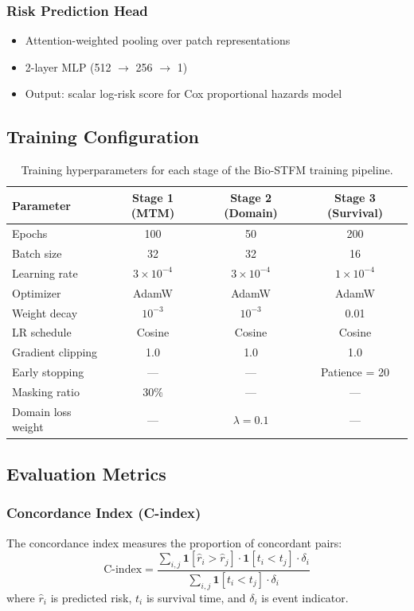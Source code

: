 \documentclass[11pt,a4paper]{article}
\begin{document}
\subsubsection{Risk Prediction Head}
\begin{itemize}
    \item Attention-weighted pooling over patch representations
    \item 2-layer MLP (512 $\rightarrow$ 256 $\rightarrow$ 1)
    \item Output: scalar log-risk score for Cox proportional hazards model
\end{itemize}

\subsection{Training Configuration}

\begin{table}[H]
\centering
\small
\caption{Training hyperparameters for each stage of the Bio-STFM training pipeline.}
\begin{tabular}{@{}lccc@{}}
\toprule
\textbf{Parameter} & \textbf{Stage 1 (MTM)} & \textbf{Stage 2 (Domain)} & \textbf{Stage 3 (Survival)} \\
\midrule
Epochs & 100 & 50 & 200 \\
Batch size & 32 & 32 & 16 \\
Learning rate & $3 \times 10^{-4}$ & $3 \times 10^{-4}$ & $1 \times 10^{-4}$ \\
Optimizer & AdamW & AdamW & AdamW \\
Weight decay & $10^{-3}$ & $10^{-3}$ & 0.01 \\
LR schedule & Cosine & Cosine & Cosine \\
Gradient clipping & 1.0 & 1.0 & 1.0 \\
Early stopping & --- & --- & Patience = 20 \\
Masking ratio & 30\% & --- & --- \\
Domain loss weight & --- & $\lambda = 0.1$ & --- \\
\bottomrule
\end{tabular}
\end{table}

\subsection{Evaluation Metrics}

\subsubsection{Concordance Index (C-index)}
The concordance index measures the proportion of concordant pairs:
\begin{equation}
\text{C-index} = \frac{\sum_{i,j} \mathbf{1}[\hat{r}_i > \hat{r}_j] \cdot \mathbf{1}[t_i < t_j] \cdot \delta_i}{\sum_{i,j} \mathbf{1}[t_i < t_j] \cdot \delta_i}
\end{equation}
where $\hat{r}_i$ is predicted risk, $t_i$ is survival time, and $\delta_i$ is event indicator.
\end{document}
